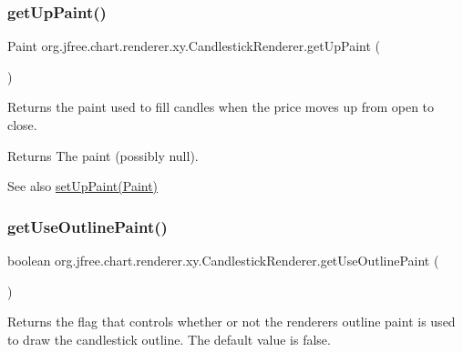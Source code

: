 \subsubsection{\texorpdfstring{get\+Up\+Paint()}{getUpPaint()}}
{\footnotesize\ttfamily Paint org.\+jfree.\+chart.\+renderer.\+xy.\+Candlestick\+Renderer.\+get\+Up\+Paint (\begin{DoxyParamCaption}{ }\end{DoxyParamCaption})}

Returns the paint used to fill candles when the price moves up from open to close.

\begin{DoxyReturn}{Returns}
The paint (possibly {\ttfamily null}).
\end{DoxyReturn}
\begin{DoxySeeAlso}{See also}
\mbox{\hyperlink{classorg_1_1jfree_1_1chart_1_1renderer_1_1xy_1_1_candlestick_renderer_aecca1e61a2e3d8ed2532c05de9c2bd39}{set\+Up\+Paint(\+Paint)}} 
\end{DoxySeeAlso}
\mbox{\label{classorg_1_1jfree_1_1chart_1_1renderer_1_1xy_1_1_candlestick_renderer_af07ad55de5bec4a88d556fa1a76f34fd}} 
\subsubsection{\texorpdfstring{get\+Use\+Outline\+Paint()}{getUseOutlinePaint()}}
{\footnotesize\ttfamily boolean org.\+jfree.\+chart.\+renderer.\+xy.\+Candlestick\+Renderer.\+get\+Use\+Outline\+Paint (\begin{DoxyParamCaption}{ }\end{DoxyParamCaption})}

Returns the flag that controls whether or not the renderer\textquotesingle{}s outline paint is used to draw the candlestick outline. The default value is {\ttfamily false}.

